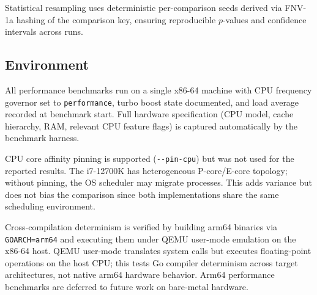 Statistical resampling uses deterministic per-comparison seeds derived
via FNV-1a hashing of the comparison key, ensuring reproducible
$p$-values and confidence intervals across runs.

\subsection{Environment}

All performance benchmarks run on a single x86-64 machine with CPU
frequency governor set to \texttt{performance}, turbo boost state
documented, and load average recorded at benchmark start.  Full hardware
specification (CPU model, cache hierarchy, RAM, relevant CPU feature
flags) is captured automatically by the benchmark harness.

CPU core affinity pinning is supported (\texttt{-{}-pin-cpu}) but was not used
for the reported results.  The i7-12700K has heterogeneous P-core/E-core
topology; without pinning, the OS scheduler may migrate processes.  This
adds variance but does not bias the comparison since both implementations
share the same scheduling environment.

Cross-compilation determinism is verified by building arm64 binaries via
\texttt{GOARCH=arm64} and executing them under QEMU user-mode emulation
on the x86-64 host.  QEMU user-mode translates system calls but executes
floating-point operations on the host CPU; this tests Go compiler
determinism across target architectures, not native arm64 hardware
behavior.  Arm64 performance benchmarks are deferred to future work on
bare-metal hardware.
